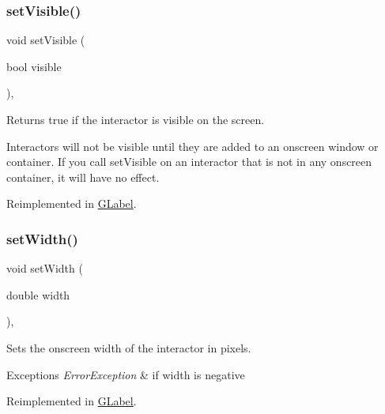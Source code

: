 \subsubsection{\texorpdfstring{set\+Visible()}{setVisible()}}
{\footnotesize\ttfamily void set\+Visible (\begin{DoxyParamCaption}\item[{bool}]{visible }\end{DoxyParamCaption})\hspace{0.3cm}{\ttfamily [virtual]}, {\ttfamily [inherited]}}



Returns true if the interactor is visible on the screen. 

Interactors will not be visible until they are added to an onscreen window or container. If you call set\+Visible on an interactor that is not in any onscreen container, it will have no effect. 

Reimplemented in \mbox{\hyperlink{classsgl_1_1GLabel_afcc2a51afef8e2e61d8d9191386fb93f}{G\+Label}}.

\mbox{\label{classsgl_1_1GInteractor_aa3f3fba4cb131baa8696ba01e3bceca1}} 
\subsubsection{\texorpdfstring{set\+Width()}{setWidth()}}
{\footnotesize\ttfamily void set\+Width (\begin{DoxyParamCaption}\item[{double}]{width }\end{DoxyParamCaption})\hspace{0.3cm}{\ttfamily [virtual]}, {\ttfamily [inherited]}}



Sets the onscreen width of the interactor in pixels. 


\begin{DoxyExceptions}{Exceptions}
{\em Error\+Exception} & if width is negative \\
\hline
\end{DoxyExceptions}


Reimplemented in \mbox{\hyperlink{classsgl_1_1GLabel_af0c5b6fb4e3c3c9a3fabde548efa93db}{G\+Label}}.

\mbox{\label{classsgl_1_1GInteractor_a9c18fcc579333bf9653d13ad2b372e39}} 

